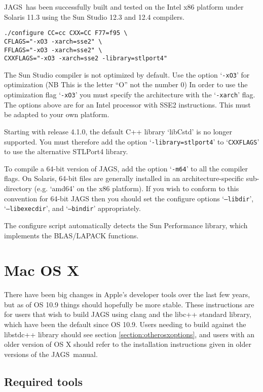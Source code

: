 \documentclass[11pt, a4paper, titlepage]{article}
\newcommand{\JAGS}{\textsf{JAGS}}
\newcommand{\samp}[1]{{`\bgroup\normalfont\texttt{#1}'\egroup}}
\newcommand{\file}[1]{{`\normalfont\textsf{#1}'}}
\let\option=\samp
\begin{document}
\JAGS\ has been successfully built and tested on the Intel x86
platform under Solaris 11.3 using the Sun Studio 12.3 and 12.4
compilers.
\begin{verbatim}
./configure CC=cc CXX=CC F77=f95 \
CFLAGS="-xO3 -xarch=sse2" \
FFLAGS="-xO3 -xarch=sse2" \
CXXFLAGS="-xO3 -xarch=sse2 -library=stlport4"
\end{verbatim}
The Sun Studio compiler is not optimized by default. Use the option
\option{-xO3} for optimization (NB This is the letter ``O'' not the
number 0) In order to use the optimization flag \option{-xO3} you
must specify the architecture with the \option{-xarch} flag. The options
above are for an Intel processor with SSE2 instructions. This must be
adapted to your own platform.

Starting with release 4.1.0, the default C++ library \file{libCstd} is
no longer supported. You must therefore add the option
\option{-library=stlport4} to \option{CXXFLAGS} to use the alternative
STLPort4 library.


To compile a 64-bit version of JAGS, add the option \option{-m64} to
all the compiler flags. On Solaris, 64-bit files are generally
installed in an architecture-specific sub-directory (e.g.
\file{amd64} on the x86 platform). If you wish to conform to this
convention for 64-bit JAGS then you should set the configure options
\option{--libdir}, \option{--libexecdir}, and \option{--bindir}
appropriately.

The configure script automatically detects the Sun Performance library,
which implements the BLAS/LAPACK functions.  

\clearpage
\section{Mac OS X}

There have been big changes in Apple's developer tools over the last few
years, but as of OS 10.9 things should hopefully be more stable.  These
instructions are for users that wish to build JAGS using clang and the
libc++ standard library, which have been the default since OS 10.9.  Users
needing to build against the libstdc++ library should see section \ref{section:otherosxoptions}, 
and users with an older version of OS X should refer to the installation
instructions given in older versions of the \JAGS~manual.

\subsection{Required tools}
\end{document}
